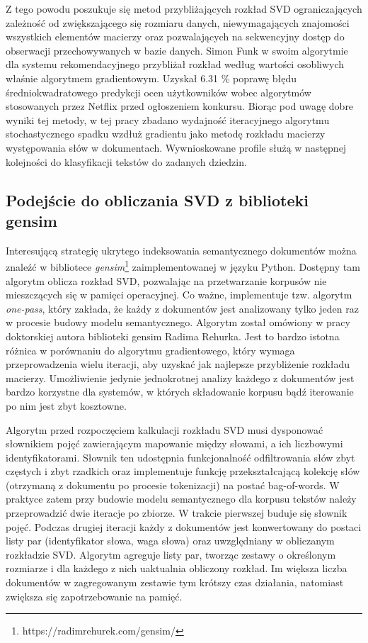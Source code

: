 \documentclass{pracamgr}
\begin{document}
Z tego powodu poszukuje się metod przybliżających rozkład SVD ograniczających zależność od zwiększającego się rozmiaru danych, niewymagających znajomości wszystkich elementów macierzy oraz pozwalających na sekwencyjny dostęp do obserwacji przechowywanych w bazie danych. Simon Funk w swoim algorytmie dla systemu rekomendacyjnego przybliżał rozkład według wartości osobliwych właśnie algorytmem gradientowym. Uzyskał 6.31 \% poprawę błędu średniokwadratowego predykcji ocen użytkowników wobec algorytmów stosowanych przez Netflix przed ogłoszeniem konkursu. Biorąc pod uwagę dobre wyniki tej metody, w tej pracy zbadano wydajność iteracyjnego algorytmu stochastycznego spadku wzdłuż gradientu jako metodę rozkładu macierzy występowania słów w dokumentach. Wywnioskowane profile służą w następnej kolejności do klasyfikacji tekstów do zadanych dziedzin.

\subsection{Podejście do obliczania SVD z biblioteki gensim}
Interesującą strategię ukrytego indeksowania semantycznego dokumentów można znaleźć w bibliotece \textit{gensim}\footnote{https://radimrehurek.com/gensim/} zaimplementowanej w języku Python. Dostępny tam algorytm oblicza rozkład SVD, pozwalając na przetwarzanie korpusów nie mieszczących się w pamięci operacyjnej. Co ważne, implementuje tzw. algorytm \textit{one-pass}, który zakłada, że każdy z dokumentów jest analizowany tylko jeden raz w procesie budowy modelu semantycznego. Algorytm został omówiony w pracy doktorskiej autora biblioteki gensim Radima Rehurka. Jest to bardzo istotna różnica w porównaniu do algorytmu gradientowego, który wymaga przeprowadzenia wielu iteracji, aby uzyskać jak najlepsze przybliżenie rozkładu macierzy. Umożliwienie jedynie jednokrotnej analizy każdego z dokumentów jest bardzo korzystne dla systemów, w których składowanie korpusu bądź iterowanie po nim jest zbyt kosztowne.

Algorytm przed rozpoczęciem kalkulacji rozkładu SVD musi dysponować słownikiem pojęć zawierającym mapowanie między słowami, a ich liczbowymi identyfikatorami. Słownik ten udostępnia funkcjonalność odfiltrowania słów zbyt częstych i zbyt rzadkich oraz implementuje funkcję przekształcającą kolekcję słów (otrzymaną z dokumentu po procesie tokenizacji) na postać bag-of-words. W praktyce zatem przy budowie modelu semantycznego dla korpusu tekstów należy przeprowadzić dwie iteracje po zbiorze. W trakcie pierwszej buduje się słownik pojęć. Podczas drugiej iteracji każdy z dokumentów jest konwertowany do postaci listy par (identyfikator słowa, waga słowa) oraz uwzględniany w obliczanym rozkładzie SVD. Algorytm agreguje listy par, tworząc zestawy o określonym rozmiarze i dla każdego z nich uaktualnia obliczony rozkład. Im większa liczba dokumentów w zagregowanym zestawie tym krótszy czas działania, natomiast zwiększa się zapotrzebowanie na pamięć.
\end{document}

